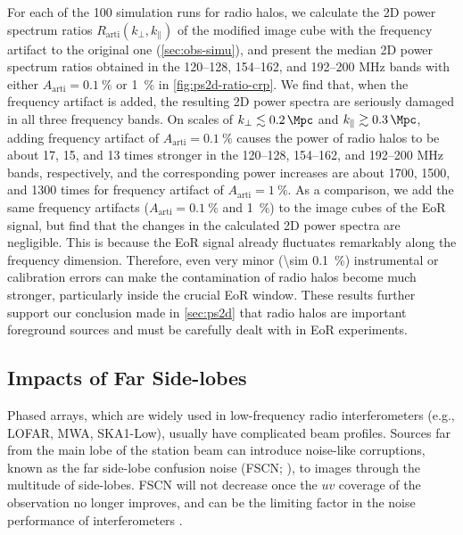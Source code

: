\documentclass[twocolumn]{aastex62}
\newcommand{\R}[1]{\mathrm{#1}}
\newcommand{\klos}{\text{$k_{\parallel}$}}
\newcommand{\kperp}{\text{$k_{\bot}$}}
\newcommand{\editone}[1]{{\leavevmode\color{cyan}#1}}
\begin{document}
For each of the 100 simulation runs for radio halos, we calculate the
2D power spectrum ratios $R_{\R{arti}}(\kperp, \klos)$ of the modified
image cube with the frequency artifact to the original one
(\autoref{sec:obs-simu}),
and present the median 2D power spectrum ratios obtained in the
\numrange{120}{128}, \numrange{154}{162}, and \numrange{192}{200}
\si{\MHz} bands with either $A_{\R{arti}} = \SI{0.1}{\percent}$ or
\SI{1}{\percent} in \autoref{fig:ps2d-ratio-crp}.
We find that, when the frequency artifact is added, the resulting 2D
power spectra are seriously damaged in all three frequency bands.
On scales of $\kperp \lesssim \SI{0.2}{\per\Mpc}$ and
\editone{$\klos \gtrsim \SI{0.3}{\per\Mpc}$},
adding frequency artifact of $A_{\R{arti}} = \SI{0.1}{\percent}$
causes the power of radio halos to be about
\editone{17, 15, and 13 times}
stronger in the \numrange{120}{128},
\numrange{154}{162}, and \numrange{192}{200} \si{\MHz} bands,
respectively, and the corresponding power increases are about
\editone{1700, 1500, and 1300 times}
for frequency artifact of $A_{\R{arti}} = \SI{1}{\percent}$.
As a comparison, we add the same frequency artifacts
($A_{\R{arti}} = \SI{0.1}{\percent}$ and \SI{1}{\percent}) to the image
cubes of the EoR signal, but find that the changes in the calculated
2D power spectra are negligible.
This is because the EoR signal already fluctuates remarkably along
the frequency dimension.
Therefore, even very minor (\SI{\sim 0.1}{\percent}) instrumental or
calibration errors can make the contamination of radio halos
become much stronger, particularly inside the crucial EoR window.
These results further support our conclusion made in \autoref{sec:ps2d}
that radio halos are important foreground sources and must be carefully
dealt with in EoR experiments.

\subsection{Impacts of Far Side-lobes}
\label{sec:far-sidelobes}

Phased arrays, which are widely used in low-frequency radio
interferometers (e.g., LOFAR, MWA, SKA1-Low), usually have complicated
beam profiles.
Sources far from the main lobe of the station beam can introduce
noise-like corruptions, known as the far side-lobe confusion noise
(FSCN; \citealt{smirnov2012}), to images through the multitude of
side-lobes.
FSCN will not decrease once the $uv$ coverage of the observation no
longer improves, and can be the limiting factor in the noise
performance of interferometers \citep{mort2017}.
\end{document}
